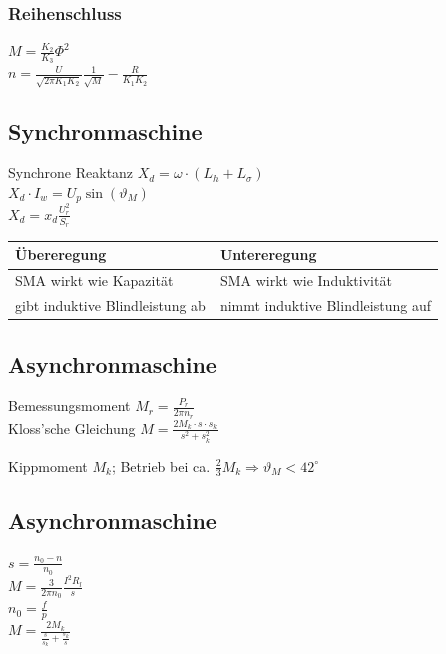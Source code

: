 \documentclass[6pt,a4paper]{scrartcl}
\begin{document}
\begin{multicols}{4}
		
		\subsubsection{Reihenschluss}
		$M = \frac{K_2}{K_3} \Phi^2$ \\
		$n = \frac{U}{\sqrt{2 \pi K_1 K_2}} \frac{1}{\sqrt{M}} - \frac{R}{K_1 K_2}$
		
		
		\subsection{Synchronmaschine}
		
		
		Synchrone Reaktanz $X_d = \omega \cdot (L_h + L_\sigma)$\\
		$X_d \cdot I_w = U_p \sin(\vartheta_M)$\\
		$X_d = x_d \frac{U_r^2}{S_r}$ \\
		\begin{tabular}{ll}
			Übereregung & Untereregung\\ \midrule
			SMA wirkt wie Kapazität & SMA wirkt wie Induktivität\\
			gibt induktive Blindleistung ab & nimmt induktive Blindleistung auf\\
		\end{tabular}
		
		\subsection{Asynchronmaschine}
		Bemessungsmoment $M_r = \frac{P_r}{2\pi n_r}$\\
		Kloss'sche Gleichung $M = \frac{2 M_k \cdot s \cdot s_k}{s^2 + s_k^2}$
		
		Kippmoment $M_k$; Betrieb bei ca. $\frac{2}{3} M_k \Rightarrow \vartheta_M < 42^\circ$\\
		
		\subsection{Asynchronmaschine}
		 
		 
		 $s = \frac{n_0 - n}{n_0}$ \\
		 $M = \frac{3}{2 \pi n_0} \frac{I^2 R_l}{s}$ \\
		 $n_0 = \frac{f}{p}$ \\
		 $M = \frac{2 M_k}{\frac{s}{s_k} + \frac{s_k}{s}}$



\end{multicols}
\end{document}
